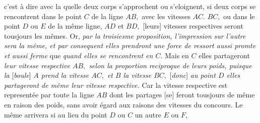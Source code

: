 c'est à dire avec la quelle deux corps s'approchent ou s'eloignent,
si deux corps se rencontrent dans le point $\displaystyle C$ de la ligne $\displaystyle AB,$
avec les vitesses $\displaystyle AC.$ $\displaystyle BC,$
ou dans le point $\displaystyle D$ ou $\displaystyle E$
de la même ligne,
$\displaystyle AD$ et $\displaystyle BD,$
[leurs]
vitesses respectives\protect{} seront tousjours les mêmes.
Or, \textit{par la troisiesme proposition, l'impression}
\textit{sur l'autre sera la même,
et par consequent elles prendront une force de ressort\protect{}
aussi promte et aussi ferme} que
\textit{quand elles se rencontrent en $\displaystyle C.$}
Mais en $\displaystyle C$ elles partageront
\textit{leur vitesse respective $\displaystyle AB,$
selon la proportion reciproque de leurs poids,\protect{}
puisque la} \protect{}[\textit{boule}]
\textit{$\displaystyle A$ prend la vitesse $\displaystyle AC,$
et $\displaystyle B$ la vitesse $\displaystyle BC,$}
[\textit{donc}]
\textit{au point $\displaystyle D$ elles partageront de même leur vitesse respective.}\protect{}
Car la vitesse respective est representée par toute la ligne $\displaystyle AB$
dont les partages [se]
feront tousjours de même en raison des poids,
sans avoir égard aux raisons des vitesses du \protect{}concours.%
Le même arrivera si au lieu du point $\displaystyle D$ ou $\displaystyle C$
un autre $\displaystyle E$ ou $\displaystyle F,$
